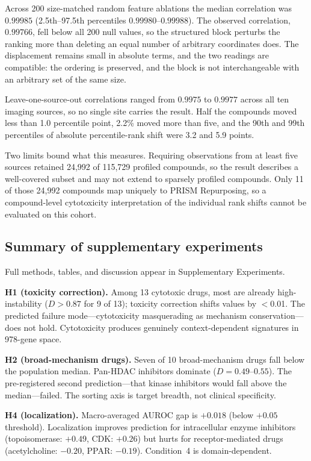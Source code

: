 \documentclass[11pt]{article}
\begin{document}
Across 200 size-matched random feature ablations the median correlation was
$0.99985$ (2.5th--97.5th percentiles $0.99980$--$0.99988$). The observed
correlation, $0.99766$, fell below all 200 null values, so the structured block
perturbs the ranking more than deleting an equal number of arbitrary
coordinates does. The displacement remains small in absolute terms, and the two
readings are compatible: the ordering is preserved, and the block is not
interchangeable with an arbitrary set of the same size.

Leave-one-source-out correlations ranged from $0.9975$ to $0.9977$ across all
ten imaging sources, so no single site carries the result. Half the compounds
moved less than 1.0 percentile point, 2.2\% moved more than five, and the 90th
and 99th percentiles of absolute percentile-rank shift were 3.2 and 5.9 points.

Two limits bound what this measures. Requiring observations from at least five
sources retained 24{,}992 of 115{,}729 profiled compounds, so the result
describes a well-covered subset and may not extend to sparsely profiled
compounds. Only 11 of those 24{,}992 compounds map uniquely to PRISM
Repurposing, so a compound-level cytotoxicity interpretation of the individual
rank shifts cannot be evaluated on this cohort.

\subsection{Summary of supplementary experiments}

Full methods, tables, and discussion appear in Supplementary Experiments.

\textbf{H1 (toxicity correction).} Among 13 cytotoxic drugs, most are already high-instability ($D > 0.87$
for 9 of 13); toxicity correction shifts values by $<$0.01. The predicted
failure mode---cytotoxicity masquerading as mechanism conservation---does
not hold. Cytotoxicity produces genuinely context-dependent signatures in
978-gene space.

\textbf{H2 (broad-mechanism drugs).} Seven of 10 broad-mechanism drugs fall below the population median.
Pan-HDAC inhibitors dominate ($D = 0.49$--$0.55$). The pre-registered
second prediction---that kinase inhibitors would fall above the
median---failed. The sorting axis is target breadth, not clinical
specificity.

\textbf{H4 (localization).} Macro-averaged AUROC gap is $+0.018$ (below $+0.05$ threshold). Localization
improves prediction for intracellular enzyme inhibitors (topoisomerase:
$+0.49$, CDK: $+0.26$) but hurts for receptor-mediated drugs
(acetylcholine: $-0.20$, PPAR: $-0.19$). Condition~4 is domain-dependent.
\end{document}
